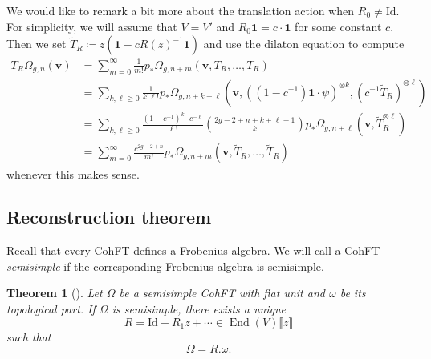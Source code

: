 \documentclass[10pt]{amsart}
\newtheorem{thm}{Theorem}[section]
\theoremstyle{definition}
\theoremstyle{remark}
\theoremstyle{plain}
\theoremstyle{definition}
\theoremstyle{remark}
\newcommand{\mbf}[1]{\mathbf{#1}}
\newcommand{\bv}{\mbf{v}}
\newcommand{\mr}[1]{\mathrm{#1}}
\newcommand{\1}{\mathbf{1}}
\newcommand{\2}{\mathbf{2}}
\newcommand{\3}{\mathbf{3}}
\newcommand{\ps}[1]{\llbracket #1 \rrbracket}
\DeclareMathOperator{\End}{End}
\begin{document}
We would like to remark a bit more about the translation action when $R_0 \neq \mr{Id}$. For simplicity, we will assume that $V = V'$ and $R_0 \1 = c \cdot \1$ for some constant $c$. Then we set $\tilde{T}_R \coloneqq z( \1 - c R(z)^{-1} \1)$ and use the dilaton equation to compute
\begin{align*}
    T_R \Omega_{g,n}(\bv) &= \sum_{m=0}^{\infty} \frac{1}{m!} p_*\Omega_{g,n+m}(\bv, T_R, \ldots, T_R) \\
    &= \sum_{k,\ell \geq 0} \frac{1}{k!\ell!} p_* \Omega_{g,n+k+\ell}(\bv, ( (1-c^{-1})\1 \cdot \psi )^{\otimes k}, ( c^{-1} \tilde{T}_R )^{\otimes \ell}) \\
    &= \sum_{k,\ell \geq 0} \frac{(1-c^{-1})^k \cdot c^{-\ell}}{\ell!} \binom{2g-2+n+k+\ell-1}{k} p_* \Omega_{g,n+\ell}(\bv, \tilde{T}_R^{\otimes \ell}) \\
    &= \sum_{m=0}^{\infty} \frac{c^{2g-2+n}}{m!} p_* \Omega_{g,n+m}(\bv, \tilde{T}_R, \ldots, \tilde{T}_R)
\end{align*}
whenever this makes sense.


\subsection{Reconstruction theorem}%
\label{sub:Reconstruction theorem}

Recall that every CohFT defines a Frobenius algebra. We will call a CohFT \textit{semisimple} if the corresponding Frobenius algebra is semisimple.

\begin{thm}[{\cite{2dsscohft}}]
    Let $\Omega$ be a semisimple CohFT with flat unit and $\omega$ be its topological part. If $\Omega$ is semisimple, there exists a unique 
    \[ R = \mr{Id} + R_1 z + \cdots \in \End(V)\ps{z} \]
    such that
    \[ \Omega = R.\omega. \]
\end{thm}
\end{document}
